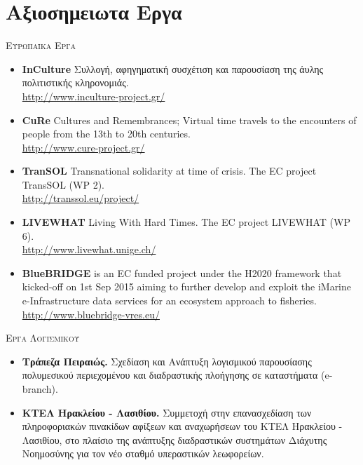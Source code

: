 \documentclass[11pt]{article}
\begin{document}
\section{Αξιοσημειωτα Εργα}
\textsc{Ευρωπαϊκα Εργα}
\begin{itemize}
\item
\textbf{InCulture} Συλλογή, αφηγηματική συσχέτιση και παρουσίαση της άυλης πολιτιστικής κληρονομιάς. \\ \url{http://www.inculture-project.gr/}
\item
\textbf{CuRe} Cultures and Remembrances; Virtual time travels to the encounters of people from the 13th to 20th centuries. \\ \url{http://www.cure-project.gr/}
\item
\textbf{TranSOL} Transnational solidarity at time of crisis. The EC project TransSOL (WP 2). \\ \url{http://transsol.eu/project/}
\item
\textbf{LIVEWHAT} Living With Hard Times. The EC project LIVEWHAT (WP 6).  \\\url{http://www.livewhat.unige.ch/}
\item
\textbf{BlueBRIDGE} is an EC funded project under the H2020 framework that kicked-off on 1st Sep 2015 aiming to further develop and exploit the iMarine e-Infrastructure data services for an ecosystem approach to fisheries. \url{http://www.bluebridge-vres.eu/}
\end{itemize}

\textsc{Εργα Λογισμικου}
\begin{itemize}
\item
\textbf{Τράπεζα Πειραιώς.} Σχεδίαση και Ανάπτυξη λογισμικού παρουσίασης πολυμεσικού περιεχομένου και διαδραστικής πλοήγησης σε καταστήματα (e-branch).
\item
\textbf{ΚΤΕΛ Ηρακλείου - Λασιθίου.} Συμμετοχή στην επανασχεδίαση των πληροφοριακών πινακίδων αφίξεων και αναχωρήσεων του ΚΤΕΛ Ηρακλείου - Λασιθίου, στο πλαίσιο της ανάπτυξης διαδραστικών συστημάτων Διάχυτης Νοημοσύνης για τον νέο σταθμό υπεραστικών λεωφορείων.
\end{itemize}
\end{document}
